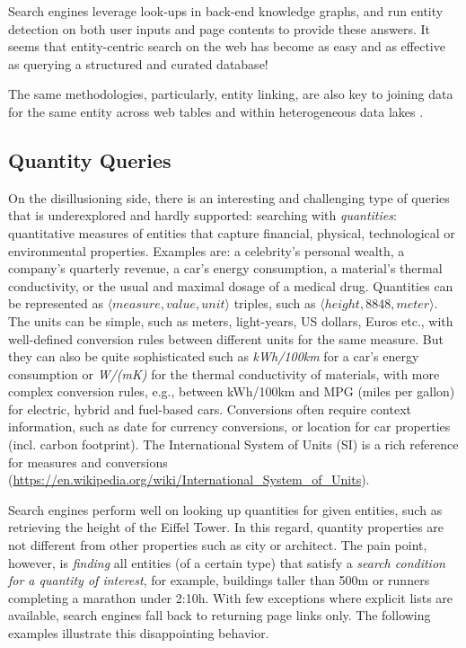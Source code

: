 \documentclass[11pt]{article}
\newcommand{\squishlist}{
 \begin{list}{$\bullet$}
  { \setlength{\itemsep}{0pt}
     \setlength{\parsep}{1pt}
     \setlength{\topsep}{1pt}
     \setlength{\partopsep}{0pt}
     \setlength{\leftmargin}{1.5em}
     \setlength{\labelwidth}{1em}
     \setlength{\labelsep}{0.5em} } }
\newcommand{\squishend}{\end{list}}
\begin{document}
Search engines leverage look-ups in back-end knowledge graphs,
and run entity detection on both user inputs and page contents
to provide these answers.
It seems that entity-centric search on the web has become as easy and 
as effective as querying a structured and curated database!

The same methodologies, particularly, entity linking,
are also key to joining data for the same entity
across web tables and
within heterogeneous data lakes \cite{Lehmberg:PVLDB2017,Zhu:SIGMOD2019}.


\subsection*{Quantity Queries}

On the disillusioning side, there is an interesting and challenging type of queries
that is underexplored and hardly supported:
searching with {\em quantities}: quantitative measures of entities
that capture financial, physical, technological or environmental properties.
Examples are: 
a celebrity's personal wealth,
a company's quarterly revenue, 
 a car's energy consumption,
 a material's thermal conductivity, or
 the usual and maximal dosage of a medical drug.
Quantities can be represented as
$\langle measure, value, unit \rangle$ triples,
such as $\langle height, 8848, meter \rangle$.
The units can be simple, such as meters, light-years, US dollars, Euros etc.,
with well-defined conversion rules between different units for the
same measure. But they can also be quite sophisticated such as
{\em kWh/100km} for a car's energy consumption or 
{\em W/(mK)}
for the thermal conductivity of materials,
with more complex conversion rules, e.g., between
kWh/100km and MPG (miles per gallon) for electric, hybrid and fuel-based cars.
Conversions often require context information, such as
date for currency conversions, or location for car properties
(incl. carbon footprint).
The International System of Units (SI) is a rich reference for
measures and conversions 
({\small\url{https://en.wikipedia.org/wiki/International_System_of_Units}}).

Search engines perform well on looking up quantities for given entities, such as
retrieving the height of the Eiffel Tower. In this regard, quantity properties
are not different from other properties such as city or architect.
The pain point, however, is {\em finding} all entities (of a certain type) that
satisfy a {\em search condition for a quantity of interest},
for example, buildings taller than 500m or runners completing a marathon under 2:10h. 
With few exceptions where explicit lists are available, search engines
fall back to returning page links only.
The following examples illustrate this disappointing behavior.
\end{document}
